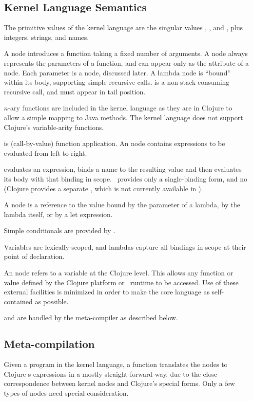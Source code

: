 \subsection{Kernel Language Semantics}
The primitive values of the kernel language are the singular values , , and , plus integers, strings, and names.

A  node introduces a function taking a fixed number of arguments. A  node always represents the parameters of a function, and can appear only as the  attribute of a  node. Each parameter is a  node, discussed later. A lambda node is ``bound'' within its body, supporting simple recursive calls.  is a non-stack-consuming recursive call, and must appear in tail position.

$n$-ary functions are included in the kernel language as they are in Clojure to allow a simple mapping to Java methods. The kernel language does not support Clojure's variable-arity functions.

 is (call-by-value) function application. An  node contains expressions to be evaluated from left to right.

 evaluates an expression, binds a name to the resulting value and then evaluates its body with that binding in scope. \Meta\ provides only a single-binding  form, and no  (Clojure provides a separate , which is not currently available in \Meta). 

A  node is a reference to the value bound by the parameter of a lambda, by the lambda itself, or by a let expression. 

Simple conditionals are provided by .

Variables are lexically-scoped, and lambdas capture all bindings in scope at their point of declaration.

An  node refers to a variable at the Clojure level. This allows any function or value defined by the Clojure platform or \Meta\ runtime to be accessed. Use of these external facilities is minimized in order to make the core language as self-contained as possible. 

 and  are handled by the meta-compiler as described below.

\subsection{Meta-compilation}
Given a program in the kernel language, a function  translates the nodes to Clojure s-expressions in a mostly straight-forward way, due to the close correspondence between kernel nodes and Clojure's special forms. Only a few types of nodes need special consideration. %

